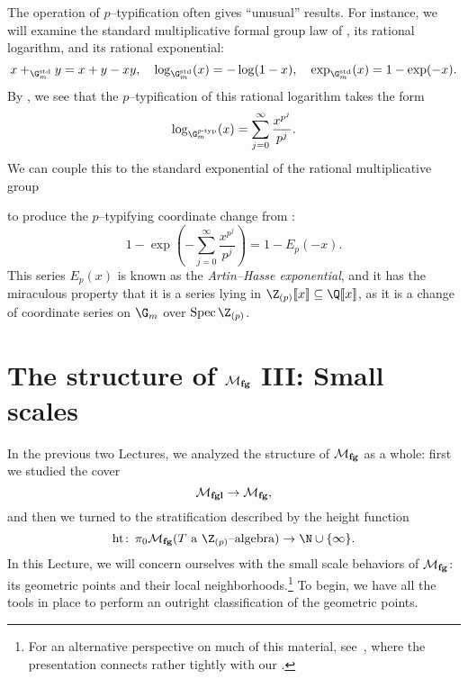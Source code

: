 \begin{remark}\label{ArtinHasseExponential}
The operation of \(p\)--typification often gives ``unusual'' results.  For instance, we will examine the standard multiplicative formal group law of , its rational logarithm, and its rational exponential:
\[
x +_{\G_m^{\mathrm{std}}} y = x + y - xy, \quad
\log_{\G_m^{\mathrm{std}}}(x) = -\log(1 - x), \quad
\exp_{\G_m^{\mathrm{std}}}(x) = 1 - \exp(-x).
\]
By , we see that the \(p\)--typification of this rational logarithm takes the form \[\log_{\G_m^{\ptyp}}(x) = \sum_{j=0}^\infty \frac{x^{p^j}}{p^j}.\]  We can couple this to the standard exponential of the rational multiplicative group
\begin{center}
\end{center}
to produce the \(p\)--typifying coordinate change from : \[1 - \exp \left( -\sum_{j=0}^\infty \frac{x^{p^j}}{p^j} \right) = 1 - E_p(-x).\]  This series \(E_p(x)\) is known as the \textit{Artin--Hasse exponential}, and it has the miraculous property that it is a series lying in \(\Z_{(p)}\ps{x} \subseteq \Q\ps{x}\), as it is a change of coordinate series on \(\G_m\) over \(\Spec \Z_{(p)}\).
\end{remark}






\section{The structure of \texorpdfstring{\(\mathcal{M}_{\mathbf{fg}}\)}{Mfg} III: Small scales}\label{SectionMfgSmallScales}

In the previous two Lectures, we analyzed the structure of \(\mathcal{M}_{\mathbf{fg}}\) as a whole: first we studied the cover \[\mathcal{M}_{\mathbf{fgl}} \to \mathcal{M}_{\mathbf{fg}},\] and then we turned to the stratification described by the height function \[\height\co \pi_0 \moduli{fg}(\text{\(T\) a \(\Z_{(p)}\)--algebra}) \to \N \cup \{\infty\}.\]  In this Lecture, we will concern ourselves with the small scale behaviors of \(\mathcal{M}_{\mathbf{fg}}\): its geometric points and their local neighborhoods.\footnote{For an alternative perspective on much of this material, see~\cite[Section 18]{StricklandFGNotes}, where the presentation connects rather tightly with our .}  To begin, we have all the tools in place to perform an outright classification of the geometric points.


